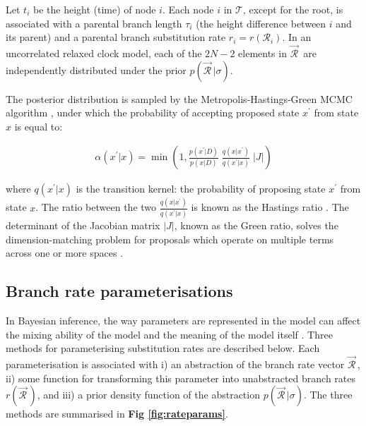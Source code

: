 \documentclass[10pt,letterpaper]{article}
\begin{document}
Let $t_i$ be the height (time) of node $i$.
Each node $i$ in $\mathcal{T}$, except for the root, is associated with a parental branch length $\tau_i$ (the height difference between $i$ and its parent)  and a parental branch substitution rate $r_i = r(\mathcal{R}_i)$. 
In an uncorrelated relaxed clock model, each of the $2N-2$ elements in $\vec{\mathcal{R}}^{\,}$ are independently distributed under the prior $p(\vec{\mathcal{R}}^{\,} | \sigma)$.



The posterior distribution is sampled by the Metropolis-Hastings-Green MCMC algorithm \cite{metropolis53, hastings70, green1995reversible},
under which the probability of accepting proposed state $x^\prime$ from state $x$ is equal to:

\begin{eqnarray}
\label{eq:MCMC}
\alpha(x^\prime|x) =  \min\left( 1, \frac{p(x^\prime|D)}{p(x|D)} \; \frac{q(x|x^\prime)}{q(x^\prime|x)} \; |J| \right)
\end{eqnarray}

\noindent
where $q(x^\prime|x)$ is the transition kernel: the probability of proposing state $x^\prime$ from state $x$.
The ratio between the two $\frac{q(x|x^\prime)}{q(x^\prime|x)}$ is known as the Hastings ratio \cite{hastings70}.
The determinant of the Jacobian matrix $|J|$, known as the Green ratio, solves the dimension-matching problem for proposals which operate on multiple terms across one or more spaces \cite{green1995reversible, geyer2003metropolis}. 




\clearpage
\subsection*{Branch rate parameterisations}
\label{sect:rateparams}

In Bayesian inference, the way parameters are represented in the model can affect the mixing ability of the model and the meaning of the model itself \cite{gelman2004parameterization}. Three methods for parameterising substitution rates are described below.
 Each parameterisation is associated with i) an abstraction of the branch rate vector $\vec{\mathcal{R}}^{\,}$, ii) some function for transforming this parameter into unabstracted branch rates $r(\vec{\mathcal{R}}^{\,})$, and iii) a prior density function of the abstraction $p(\vec{\mathcal{R}}^{\,} | \sigma) $. 
 The three methods are summarised in \textbf{Fig \ref{fig:rateparams}}.
\end{document}
